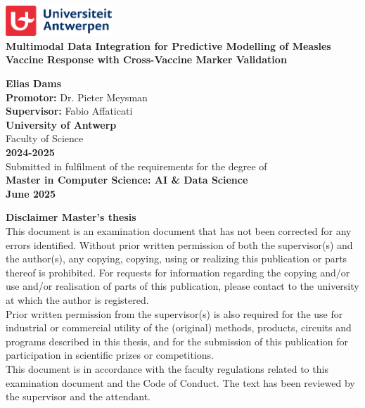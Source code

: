 \documentclass[12pt,a4paper]{report}
\begin{document}
\begin{titlepage}
    \centering
    
    \includegraphics[width=0.3\textwidth]{images/uantwerpen_logo.png}\\[1cm]
    {\Huge \textbf{Multimodal Data Integration for Predictive Modelling of Measles Vaccine Response with Cross-Vaccine Marker Validation}} \\
    \vfill
    
    {\Large \textbf{Elias Dams}}\\[1cm]
    
    \textbf{Promotor:} Dr. Pieter Meysman\\
    \textbf{Supervisor:} Fabio Affaticati\\[1.5cm]
    
    {\Large \textbf{University of Antwerp}}\\
    {\large Faculty of Science}\\[0.5cm]
    
    \textbf{2024-2025}\\[1.5cm]
    
    Submitted in fulfilment of the requirements for the degree of\\
    \textbf{Master in Computer Science: AI \& Data Science}\\[1cm]
    
    \textbf{June 2025}\\[2cm]
    
    \vfill

\end{titlepage}

\clearpage
\thispagestyle{empty}
\vspace*{\fill}               %
\noindent
\begin{minipage}[b]{\textwidth}
  \raggedright
  \textbf{Disclaimer Master’s thesis}\\[2ex]
  This document is an examination document that has not been corrected for any errors identified. Without prior written permission of both the supervisor(s) and the author(s), any copying, copying, using or realizing this publication or parts thereof is prohibited. For requests for information regarding the copying and/or use and/or realisation of parts of this publication, please contact to the university at which the author is registered.\\[2ex]
  Prior written permission from the supervisor(s) is also required for the use for industrial or commercial utility of the (original) methods, products, circuits and programs described in this thesis, and for the submission of this publication for participation in scientific prizes or competitions.\\[2ex]
  This document is in accordance with the faculty regulations related to this examination document and the Code of Conduct. The text has been reviewed by the supervisor and the attendant.
\end{minipage}
\clearpage
\end{document}
